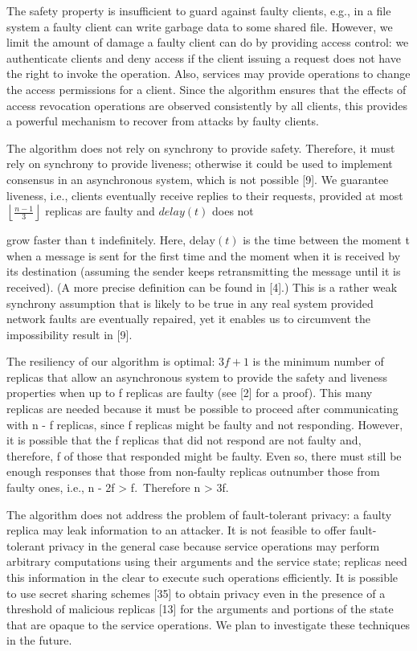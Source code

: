 \documentclass[
]{article}
\begin{document}
The safety property is insufficient to guard against faulty clients,
e.g., in a file system a faulty client can write garbage data to some
shared file. However, we limit the amount of damage a faulty client can
do by providing access control: we authenticate clients and deny access
if the client issuing a request does not have the right to invoke the
operation. Also, services may provide operations to change the access
permissions for a client. Since the algorithm ensures that the effects
of access revocation operations are observed consistently by all
clients, this provides a powerful mechanism to recover from attacks by
faulty clients.

The algorithm does not rely on synchrony to provide safety. Therefore,
it must rely on synchrony to provide liveness; otherwise it could be
used to implement consensus in an asynchronous system, which is not
possible {[}9{]}. We guarantee liveness, i.e., clients eventually
receive replies to their requests, provided at most
\(\left\lfloor\frac{n-1}{3}\right\rfloor\) replicas are faulty and
\(delay(t)\) does not

grow faster than t indefinitely. Here, \(\text{delay}(t)\) is the time
between the moment t when a message is sent for the first time and the
moment when it is received by its destination (assuming the sender keeps
retransmitting the message until it is received). (A more precise
definition can be found in {[}4{]}.) This is a rather weak synchrony
assumption that is likely to be true in any real system provided network
faults are eventually repaired, yet it enables us to circumvent the
impossibility result in {[}9{]}.

The resiliency of our algorithm is optimal: \(3f+1\) is the minimum
number of replicas that allow an asynchronous system to provide the
safety and liveness properties when up to f replicas are faulty (see
{[}2{]} for a proof). This many replicas are needed because it must be
possible to proceed after communicating with n - f replicas, since f
replicas might be faulty and not responding. However, it is possible
that the f replicas that did not respond are not faulty and, therefore,
f of those that responded might be faulty. Even so, there must still be
enough responses that those from non-faulty replicas outnumber those
from faulty ones, i.e., n - 2f \textgreater{} f.~Therefore n
\textgreater{} 3f.

The algorithm does not address the problem of fault-tolerant privacy: a
faulty replica may leak information to an attacker. It is not feasible
to offer fault-tolerant privacy in the general case because service
operations may perform arbitrary computations using their arguments and
the service state; replicas need this information in the clear to
execute such operations efficiently. It is possible to use secret
sharing schemes {[}35{]} to obtain privacy even in the presence of a
threshold of malicious replicas {[}13{]} for the arguments and portions
of the state that are opaque to the service operations. We plan to
investigate these techniques in the future.
\end{document}
